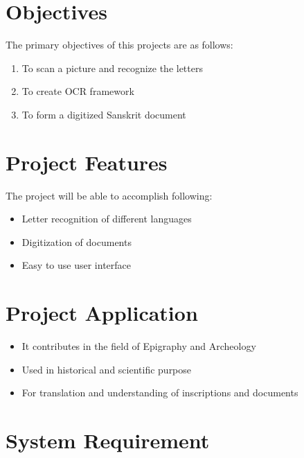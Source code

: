 \section{Objectives}
The primary objectives of this projects are as follows:
\vspace{-18pt}
\begin{enumerate}
\item To scan a picture and recognize the letters
\item To create OCR framework 
\item To form a digitized Sanskrit document
\end{enumerate}

\section{Project Features}
The project will be able to accomplish following:
\vspace{-18pt}
\begin{itemize}
\item Letter recognition of different languages
\item Digitization of documents
\item Easy to use user interface 
\end{itemize}

\section{Project Application}
\vspace{-18pt}
\begin{itemize}
\item It contributes in the field of Epigraphy and Archeology
\item Used in historical and scientific purpose
\item For translation and understanding of inscriptions and documents 
\end{itemize}

\section{System Requirement}
\vspace{-18pt}
